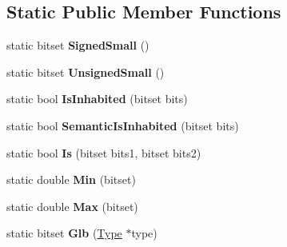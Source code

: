 \subsection*{Static Public Member Functions}
\begin{DoxyCompactItemize}
\item 
static bitset {\bfseries Signed\+Small} ()\hypertarget{classv8_1_1internal_1_1_bitset_type_afe6bed368336a054573c77c61744d9ff}{}\label{classv8_1_1internal_1_1_bitset_type_afe6bed368336a054573c77c61744d9ff}

\item 
static bitset {\bfseries Unsigned\+Small} ()\hypertarget{classv8_1_1internal_1_1_bitset_type_a73e0a5b04a0218c3f30c16c9fa71b695}{}\label{classv8_1_1internal_1_1_bitset_type_a73e0a5b04a0218c3f30c16c9fa71b695}

\item 
static bool {\bfseries Is\+Inhabited} (bitset bits)\hypertarget{classv8_1_1internal_1_1_bitset_type_a5624fbf59a95893749997ad172c7c3a8}{}\label{classv8_1_1internal_1_1_bitset_type_a5624fbf59a95893749997ad172c7c3a8}

\item 
static bool {\bfseries Semantic\+Is\+Inhabited} (bitset bits)\hypertarget{classv8_1_1internal_1_1_bitset_type_a1292353535250078ea423de03fe54ba7}{}\label{classv8_1_1internal_1_1_bitset_type_a1292353535250078ea423de03fe54ba7}

\item 
static bool {\bfseries Is} (bitset bits1, bitset bits2)\hypertarget{classv8_1_1internal_1_1_bitset_type_a9cae44574beeb19c5a899411241bf0e4}{}\label{classv8_1_1internal_1_1_bitset_type_a9cae44574beeb19c5a899411241bf0e4}

\item 
static double {\bfseries Min} (bitset)\hypertarget{classv8_1_1internal_1_1_bitset_type_a678841cc6649b775b914a4bf50d18ef5}{}\label{classv8_1_1internal_1_1_bitset_type_a678841cc6649b775b914a4bf50d18ef5}

\item 
static double {\bfseries Max} (bitset)\hypertarget{classv8_1_1internal_1_1_bitset_type_a5260dffc92937d1c44948b7371d71f66}{}\label{classv8_1_1internal_1_1_bitset_type_a5260dffc92937d1c44948b7371d71f66}

\item 
static bitset {\bfseries Glb} (\hyperlink{classv8_1_1internal_1_1_type}{Type} $\ast$type)\hypertarget{classv8_1_1internal_1_1_bitset_type_a279175e40fc9ea1778b44884ac4294e0}{}\label{classv8_1_1internal_1_1_bitset_type_a279175e40fc9ea1778b44884ac4294e0}


\end{DoxyCompactItemize}
